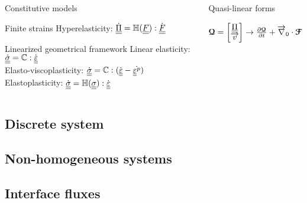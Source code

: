 \begin{frame}
  \begin{columns}
    \begin{column}{0.5\textwidth}
      \begin{block}{Constitutive models}
        \begin{block}{Finite strains}
          Hyperelasticity: $\dot{{\underline{\underline{\Pi}}}} = \mathbb{H}({\underline{\underline{F}}}) : \dot{{\underline{\underline{F}}}}$
        \end{block}
        \begin{block}{Linearized geometrical framework}
          Linear elasticity: $\dot{{\underline{\underline{\sigma}}}} = \mathbb{C} : \dot{{\underline{\underline{\varepsilon}}}}$ \\
          Elasto-viscoplasticity: $\dot{{\underline{\underline{\sigma}}}} = \mathbb{C} : (\dot{{\underline{\underline{\varepsilon}}}}-\dot{{\underline{\underline{\varepsilon}}}^p})$\\
          Elastoplasticity: $\dot{{\underline{\underline{\sigma}}}} = \mathbb{H}({\underline{\underline{\sigma}}}) : \dot{{\underline{\underline{\varepsilon}}}}$
        \end{block}    
      \end{block}
    \end{column}
    \pause
    \begin{column}{0.5\textwidth}
      \begin{block}{Quasi-linear forms}
        \begin{block}{}
          ${\boldsymbol{\mathcal{Q}}}=\left[\begin{matrix}{\underline{\underline{\Pi}}}\\{\overrightarrow{v}}\end{matrix}\right] \rightarrow \frac{\partial {\boldsymbol{\mathcal{Q}}}}{\partial t} + {\overrightarrow{\nabla}}_0 \cdot {\boldsymbol{\mathcal{F}}} = {\boldsymbol{\mathcal{S}}}$
        \end{block}
        \begin{block}{}
        \end{block}    
      \end{block}
    \end{column}
  \end{columns}
  
  
\end{frame}

\subsection{Discrete system}
\subsection{Non-homogeneous systems}
\subsection{Interface fluxes}
